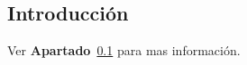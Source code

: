 \documentclass[
  10pt]{article}
\renewcommand*\listfigurename{Listado de Figuras}
\newcommand\listfigurename{Listado de Figuras}
\renewcommand*\listtablename{Listado de Tablas}
\newcommand\listtablename{Listado de Tablas}
\begin{document}
\newpage


\renewcommand{\listfigurename}{Lista de figuras}
\renewcommand{\listtablename}{Lista de tablas}
\listoffigures
\listoftables

\newpage
\printacronyms[name=Abreviaturas]    

\newpage


\newpage



\newpage
{}
\subsection{Introducción}\label{sec-intro}

Ver \textbf{Apartado}~\ref{sec-intro} para mas información.
\end{document}
